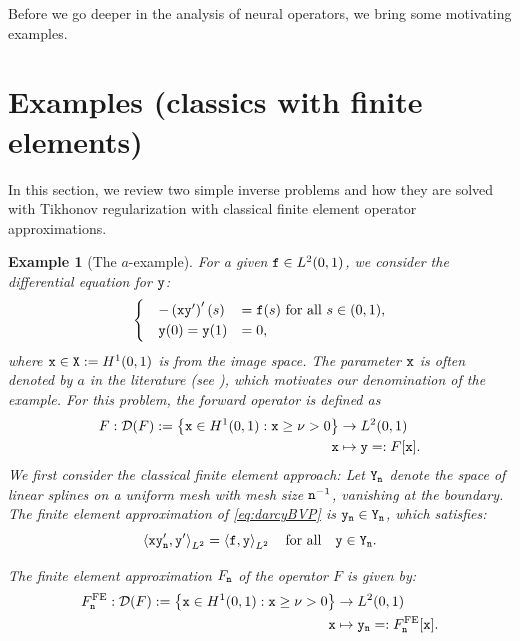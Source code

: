 \documentclass[10pt]{article}
\numberwithin{equation}{section}
\newtheorem{example}[example]{Example}
\theoremstyle{nonumberplain}
\newcommand{\set}[1]{\left\{#1\right\}}
\newcommand{\inner}[2]{\left<#1,#2\right>}
\newcommand{\X}{{\tt X}}
\newcommand{\Y}{{\tt Y}}
\newcommand{\y}{{\tt y}}
\newcommand{\n}{{\tt n}}
\newcommand{\x}{{\tt x}}
\begin{document}
Before we go deeper in the analysis of neural operators, we bring some motivating examples.


\section{Examples (classics with finite elements)} \label{se:examples}

In this section, we review two simple inverse problems and how they are solved with Tikhonov regularization with classical finite element operator approximations. 

\begin{example}[The $a$-example]\label{ex: darcyflow}
	For a given ${\tt f} \in  L^2(0,1)$, we consider the differential equation for $\y$:
	\begin{equation} \label{eq:darcyBVP}
		\begin{cases}
			\quad -\left(\x \y'\right)'(s) &= {\tt f}(s) \text{ for all }s \in (0,1),\\
			\quad  \y(0) = \y(1) &= 0,
		\end{cases}		
	\end{equation}
	where $\x \in \X:=H^1(0,1)$ is from the image space. The parameter $\x$ is often denoted by $a$ in the literature (see \cite{EngKunNeu89,NeuSch90}), which motivates our denomination of the example. 
	For this problem, the forward operator is defined as
	\begin{equation}\label{eq:darcyflow}
		\begin{aligned}
			F: \mathcal{D}(F):= \set{\x \in H^1(0,1): \x \geq \nu>0} & \to L^2(0,1)\;\\
			\x & \mapsto \y =: F[\x].
		\end{aligned}
	\end{equation}
    We first consider the classical \emph{finite element approach}: 
	Let $\Y_\n$ denote the space of linear splines on a uniform mesh with mesh size $\n^{-1}$, vanishing at the boundary. The finite element approximation of \autoref{eq:darcyBVP} is $\y_\n \in \Y_\n$, which satisfies:
	\begin{equation}\label{eq:disc}
		\inner{\x\y_\n'}{\tt y'}_{L^2} = \inner{\tt f}{\tt y}_{L^2} \quad \text{for all} \quad \tt y \in \Y_\n.
	\end{equation}
    
	The finite element approximation $F_\n$ of the operator $F$ is given by:
	\begin{equation}\label{eq:fea}
		\begin{aligned}
			F^{\text{FE}}_\n: \mathcal{D}(F):= \set{\x \in H^1(0,1): \x \geq \nu>0} & \to L^2(0,1)\;\\
			\x & \mapsto \y_\n=: F^{\text{FE}}_\n[\x].
		\end{aligned}
	\end{equation}
	

\end{example}
\end{document}
